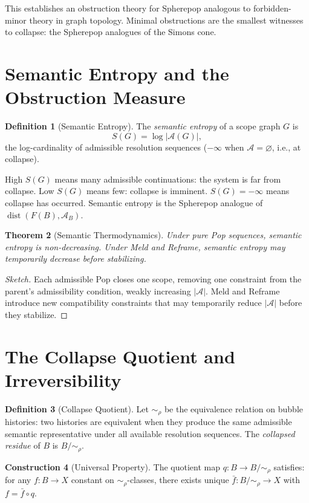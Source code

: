 \documentclass[12pt,oneside]{book}
\theoremstyle{plain}
\newtheorem{theorem}{Theorem}[chapter]
\theoremstyle{definition}
\newtheorem{definition}[theorem]{Definition}
\newtheorem{construction}[theorem]{Construction}
\theoremstyle{remark}
\newcommand{\Admiss}{\mathcal{A}}
\newcommand{\dist}{\operatorname{dist}}
\begin{document}
This establishes an obstruction theory for Spherepop analogous to
forbidden-minor theory in graph topology. Minimal obstructions are the
smallest witnesses to collapse: the Spherepop analogues of the Simons cone.

\section{Semantic Entropy and the Obstruction Measure}

\begin{definition}[Semantic Entropy]
The \emph{semantic entropy} of a scope graph $G$ is
\[
  S(G) = \log|\Admiss(G)|,
\]
the log-cardinality of admissible resolution sequences ($-\infty$ when
$\Admiss = \varnothing$, i.e., at collapse).
\end{definition}

High $S(G)$ means many admissible continuations: the system is far from
collapse. Low $S(G)$ means few: collapse is imminent. $S(G) = -\infty$
means collapse has occurred. Semantic entropy is the Spherepop analogue
of $\dist(F(B), \Admiss_B)$.

\begin{theorem}[Semantic Thermodynamics]
Under pure Pop sequences, semantic entropy is non-decreasing. Under Meld
and Reframe, semantic entropy may temporarily decrease before stabilizing.
\end{theorem}

\begin{proof}[Sketch]
Each admissible Pop closes one scope, removing one constraint from the
parent's admissibility condition, weakly increasing $|\Admiss|$. Meld and
Reframe introduce new compatibility constraints that may temporarily
reduce $|\Admiss|$ before they stabilize.
\end{proof}

\section{The Collapse Quotient and Irreversibility}

\begin{definition}[Collapse Quotient]
Let $\sim_\rho$ be the equivalence relation on bubble histories: two histories
are equivalent when they produce the same admissible semantic representative
under all available resolution sequences. The \emph{collapsed residue} of
$B$ is $B/{\sim_\rho}$.
\end{definition}

\begin{construction}[Universal Property]
The quotient map $q : B \to B/{\sim_\rho}$ satisfies: for any $f : B \to X$
constant on $\sim_\rho$-classes, there exists unique $\bar{f} : B/{\sim_\rho}
\to X$ with $f = \bar{f} \circ q$.
\end{construction}
\end{document}
